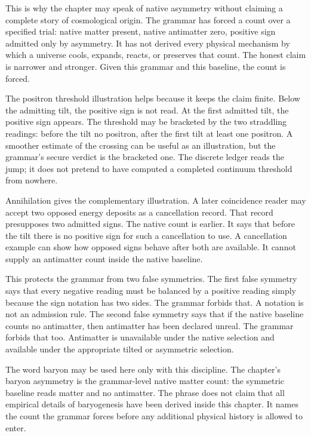 This is why the chapter may speak of native asymmetry without claiming a
complete story of cosmological origin. The grammar has forced a count over a
specified trial: native matter present, native antimatter zero, positive sign
admitted only by asymmetry. It has not derived every physical mechanism by
which a universe cools, expands, reacts, or preserves that count. The honest
claim is narrower and stronger. Given this grammar and this baseline, the
count is forced.

The positron threshold illustration helps because it keeps the claim finite.
Below the admitting tilt, the positive sign is not read. At the first
admitted tilt, the positive sign appears. The threshold may be bracketed by
the two straddling readings: before the tilt no positron, after the first
tilt at least one positron. A smoother estimate of the crossing can be useful
as an illustration, but the grammar's secure verdict is the bracketed one.
The discrete ledger reads the jump; it does not pretend to have computed a
completed continuum threshold from nowhere.

Annihilation gives the complementary illustration. A later coincidence
reader may accept two opposed energy deposits as a cancellation record. That
record presupposes two admitted signs. The native count is earlier. It says
that before the tilt there is no positive sign for such a cancellation to
use. A cancellation example can show how opposed signs behave after both are
available. It cannot supply an antimatter count inside the native baseline.

This protects the grammar from two false symmetries. The first false
symmetry says that every negative reading must be balanced by a positive
reading simply because the sign notation has two sides. The grammar forbids
that. A notation is not an admission rule. The second false symmetry says
that if the native baseline counts no antimatter, then antimatter has been
declared unreal. The grammar forbids that too. Antimatter is unavailable
under the native selection and available under the appropriate tilted or
asymmetric selection.

The word baryon may be used here only with this discipline. The chapter's
baryon asymmetry is the grammar-level native matter count: the symmetric
baseline reads matter and no antimatter. The phrase does not claim that all
empirical details of baryogenesis have been derived inside this chapter. It
names the count the grammar forces before any additional physical history is
allowed to enter.

